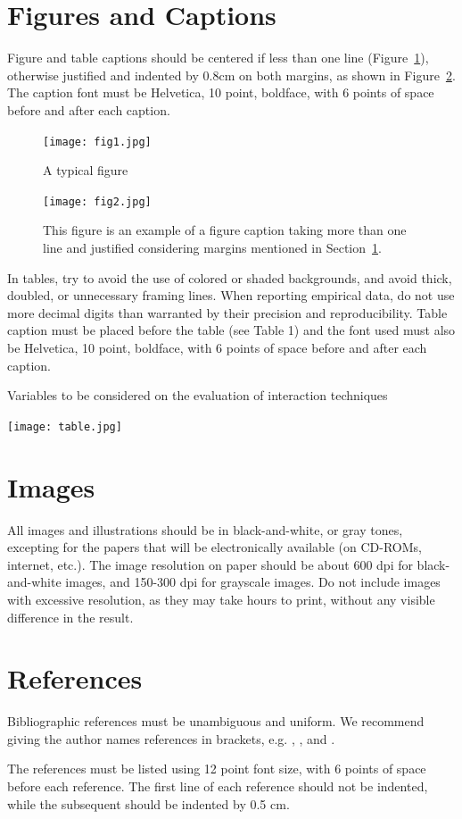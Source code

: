 \documentclass[12pt]{article}
\begin{document}
\section{Figures and Captions}\label{sec:figs}


Figure and table captions should be centered if less than one line
(Figure~\ref{fig:exampleFig1}), otherwise justified and indented by 0.8cm on
both margins, as shown in Figure~\ref{fig:exampleFig2}. The caption font must
be Helvetica, 10 point, boldface, with 6 points of space before and after each
caption.

\begin{figure}[ht]
\centering
\texttt{[image: fig1.jpg]}
\caption{A typical figure}
\label{fig:exampleFig1}
\end{figure}

\begin{figure}[ht]
\centering
\texttt{[image: fig2.jpg]}
\caption{This figure is an example of a figure caption taking more than one
  line and justified considering margins mentioned in Section~\ref{sec:figs}.}
\label{fig:exampleFig2}
\end{figure}

In tables, try to avoid the use of colored or shaded backgrounds, and avoid
thick, doubled, or unnecessary framing lines. When reporting empirical data,
do not use more decimal digits than warranted by their precision and
reproducibility. Table caption must be placed before the table (see Table 1)
and the font used must also be Helvetica, 10 point, boldface, with 6 points of
space before and after each caption.

\begin{table}[ht]
\centering
\caption{Variables to be considered on the evaluation of interaction
  techniques}
\label{tab:exTable1}
\texttt{[image: table.jpg]}
\end{table}

\section{Images}

All images and illustrations should be in black-and-white, or gray tones,
excepting for the papers that will be electronically available (on CD-ROMs,
internet, etc.). The image resolution on paper should be about 600 dpi for
black-and-white images, and 150-300 dpi for grayscale images.  Do not include
images with excessive resolution, as they may take hours to print, without any
visible difference in the result. 

\section{References}

Bibliographic references must be unambiguous and uniform.  We recommend giving
the author names references in brackets, e.g. \cite{knuth:84},
\cite{boulic:91}, and \cite{smith:99}.

The references must be listed using 12 point font size, with 6 points of space
before each reference. The first line of each reference should not be
indented, while the subsequent should be indented by 0.5 cm.



\end{document}
